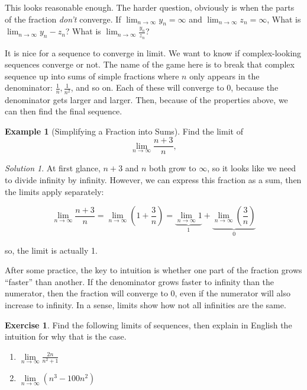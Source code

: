 \documentclass[
]{book}
\providecommand{\tightlist}{%
  \setlength{\itemsep}{0pt}\setlength{\parskip}{0pt}}
\theoremstyle{definition}
\theoremstyle{definition}
\newtheorem{example}{Example}[chapter]
\theoremstyle{definition}
\newtheorem{exercise}{Exercise}[chapter]
\theoremstyle{remark}
\newtheorem*{solution}{Solution}
\begin{document}
This looks reasonable enough. The harder question, obviously is when the parts of the fraction \emph{don't} converge. If \(\lim_{n\to\infty} y_n = \infty\) and \(\lim_{n\to\infty} z_n = \infty\), What is \(\lim_{n\to\infty} y_n - z_n\)? What is \(\lim_{n\to\infty} \frac{y_n}{z_n}\)?

It is nice for a sequence to converge in limit. We want to know if complex-looking sequences converge or not. The name of the game here is to break that complex sequence up into sums of simple fractions where \(n\) only appears in the denominator: \(\frac{1}{n}, \frac{1}{n^2}\), and so on. Each of these will converge to 0, because the denominator gets larger and larger. Then, because of the properties above, we can then find the final sequence.

\begin{example}[Simplifying a Fraction into Sums]
\protect\hypertarget{exm:unnamed-chunk-3}{}{\label{exm:unnamed-chunk-3} {} }Find the limit of
\[\lim_{n\to \infty} \frac{n + 3}{n},\]
\end{example}

\begin{solution}
{}At first glance, \(n + 3\) and \(n\) both grow to \(\infty\), so it looks like we need to divide infinity by infinity. However, we can express this fraction as a sum, then the limits apply separately:

\[\lim_{n\to \infty} \frac{n + 3}{n} = \lim_{n\to \infty} \left(1 + \frac{3}{n}\right) =  \underbrace{\lim_{n\to \infty}1}_{1} +  \underbrace{\lim_{n\to \infty}\left(\frac{3}{n}\right)}_{0}\]

so, the limit is actually 1.
\end{solution}

After some practice, the key to intuition is whether one part of the fraction grows ``faster'' than another. If the denominator grows faster to infinity than the numerator, then the fraction will converge to 0, even if the numerator will also increase to infinity. In a sense, limits show how not all infinities are the same.

\begin{exercise}
\protect\hypertarget{exr:limseq2}{}{\label{exr:limseq2} }Find the following limits of sequences, then explain in English the intuition for why that is the case.

\begin{enumerate}
\def\labelenumi{\arabic{enumi}.}
\tightlist
\item
  \(\lim\limits_{n\to\infty} \frac{2n}{n^2 + 1}\)
\item
  \(\lim\limits_{n\to\infty} (n^3 - 100n^2)\)
\end{enumerate}
\end{exercise}
\end{document}
